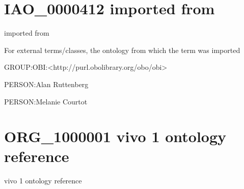\documentclass[letterpaper,10pt,english]{sphinxmanual}
\begin{document}
\section{IAO\_0000412 \sphinxhyphen{} imported from}
\label{\detokenize{doc-IAO_0000412:iao-0000412-imported-from}}\label{\detokenize{doc-IAO_0000412:index-0}}\label{\detokenize{doc-IAO_0000412::doc}}
\begin{sphinxShadowBox}

\sphinxAtStartPar
imported from
\end{sphinxShadowBox}

\begin{sphinxShadowBox}

\sphinxAtStartPar
For external terms/classes, the ontology from which the term was imported
\end{sphinxShadowBox}

\begin{sphinxShadowBox}

\sphinxAtStartPar
GROUP:OBI:\textless{}http://purl.obolibrary.org/obo/obi\textgreater{}
\end{sphinxShadowBox}

\begin{sphinxShadowBox}

\sphinxAtStartPar
PERSON:Alan Ruttenberg

\sphinxAtStartPar
PERSON:Melanie Courtot
\end{sphinxShadowBox}
\begin{quote}
\label{\detokenize{doc-ORG_1000001:org-1000001}}\label{\detokenize{doc-ORG_1000001:vivo-1-ontology-reference}}\label{\detokenize{doc-ORG_1000001:org-1000001}}
\ignorespaces \end{quote}


\section{ORG\_1000001 \sphinxhyphen{} vivo 1 ontology reference}
\label{\detokenize{doc-ORG_1000001:org-1000001-vivo-1-ontology-reference}}\label{\detokenize{doc-ORG_1000001:index-0}}\label{\detokenize{doc-ORG_1000001::doc}}
\begin{sphinxShadowBox}

\sphinxAtStartPar
vivo 1 ontology reference
\end{sphinxShadowBox}
\end{document}
